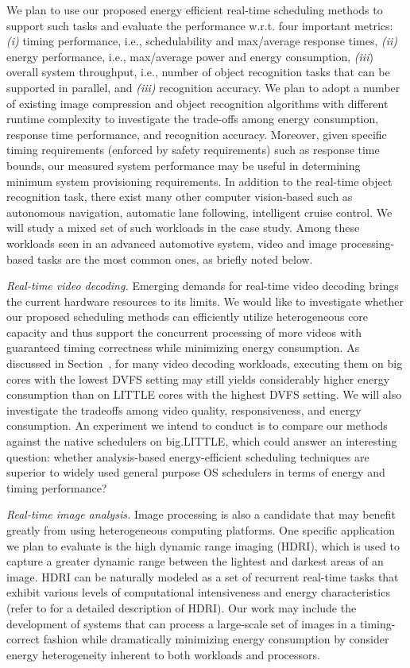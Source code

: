 We plan to use our proposed energy efficient real-time scheduling methods to support such tasks and evaluate the performance w.r.t. four important metrics: \textit{(i)} timing performance, i.e., schedulability and max/average response times, \textit{(ii)} energy performance, i.e., max/average power and energy consumption, \textit{(iii}) overall system throughput, i.e., number of object recognition tasks that can be supported in parallel, and \textit{(iii)} recognition accuracy.  We plan to adopt a number of existing image compression and object recognition algorithms with different runtime complexity to investigate the trade-offs among energy consumption, response time performance, and recognition accuracy.  
Moreover, given specific timing requirements (enforced by safety requirements) such as response time bounds, our measured system performance may be useful in determining minimum system provisioning requirements. In addition to the real-time object recognition task, there exist many other computer vision-based such as autonomous navigation, automatic lane following, intelligent cruise control. We will study a mixed set of such workloads in the case study. Among these workloads seen in an advanced automotive system, video and image processing-based tasks are the most common ones, as briefly noted below.

\textit{Real-time video decoding.} Emerging demands for real-time video decoding brings the current hardware resources to its limits. We would like to investigate whether our proposed scheduling methods can efficiently utilize heterogeneous core capacity and thus support the concurrent processing of more videos with guaranteed timing correctness while minimizing energy consumption. As discussed in Section~\cite{sec:hardware}, for many video decoding workloads, executing them on big cores with the lowest DVFS setting may still yields considerably higher energy consumption than on LITTLE cores with the highest DVFS setting. We will also investigate the tradeoffs among video quality, responsiveness, and energy consumption. An experiment we intend to conduct is to compare our methods against the native schedulers on big.LITTLE, which could answer an interesting question: whether analysis-based energy-efficient scheduling techniques are superior to widely used general purpose OS schedulers in terms of energy and timing performance?

\textit{Real-time image analysis.} Image processing is also a candidate that may benefit greatly from using heterogeneous computing platforms. One specific application we plan to evaluate is the high dynamic range imaging (HDRI), which is used to capture a greater dynamic range between the lightest and darkest areas of an image. HDRI can be naturally modeled as a set of recurrent real-time tasks that exhibit various levels of computational intensiveness and energy characteristics  (refer to \cite{kuang2007evaluating} for a detailed description of HDRI). Our work may include the development of systems that can process a large-scale set of images in a timing-correct fashion while dramatically minimizing energy consumption by consider energy heterogeneity inherent to both workloads and processors.